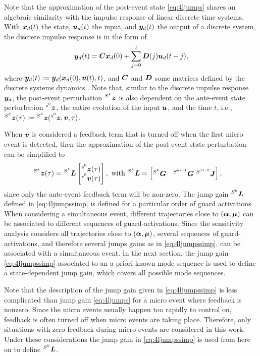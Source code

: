 \documentclass[../DC2019003Bouma.tex]{subfiles}
\begin{document}
Note that the approximation of the post-event state \eqref{eq:4ljumps} shares an algebraic similarity with the impulse response of linear discrete time systems. With ${\boldsymbol{x}}_d(t)$ the state, ${\boldsymbol{u}}_d(t)$ the input, and ${\boldsymbol{y}}_d(t)$ the output of a discrete system, the discrete impulse response is in the form of
\begin{align}
{\boldsymbol{y}}_d(t) = {\boldsymbol{C}}{\boldsymbol{x}}_d(0) + \sum_{j=0}^t{\boldsymbol{D}}(j){\boldsymbol{u}}_d(t-j),
\end{align}
where ${\boldsymbol{y}}_d(t) :=  {\boldsymbol{y}}_d({\boldsymbol{x}}_d(0),{\boldsymbol{u}}(t),t)$, and ${\boldsymbol{C}}$ and ${\boldsymbol{D}}$ some matrices defined by the discrete systems dynamics \cite{Hespanha2009}. Note that, similar to the discrete impulse response ${\boldsymbol{y}}_d$, the post-event perturbation $\hspace{0cm}^{S^k}{\boldsymbol{z}}$ is also dependent on the ante-event state perturbation $\hspace{0cm}^{s^0}{\boldsymbol{z}}$, the entire evolution of the input ${\boldsymbol{u}}$, and the time $t$, i.e., $\hspace{0cm}^{S^k}{\boldsymbol{z}}(\tau) := \hspace{0cm}^{S^k}{\boldsymbol{z}}(\hspace{0cm}^{s^0}{\boldsymbol{z}},{\boldsymbol{v}},\tau)$.

When ${\boldsymbol{v}}$ is considered a feedback term that is turned off when the first micro event is detected, then the approximation of the post-event state perturbation can be simplified to
\begin{align}
\hspace{0cm}^{S^k}{\boldsymbol{z}}(\tau) &= \hspace{0cm}^{S^k}{\boldsymbol{L}} \begin{bmatrix}
\hspace{0cm}^{s^0}{\boldsymbol{z}}(\tau) \\ \hspace{0cm}^{s^0}{\boldsymbol{v}}(\tau)
\end{bmatrix}, \text{ with }\hspace{0cm}^{S^k}{\boldsymbol{L}} = \begin{bmatrix}
\hspace{0cm}^{S^k}{\boldsymbol{G}} & \hspace{0cm}^{S^{k\leftarrow 1}}{\boldsymbol{G}}\ \hspace{0cm}^{S^{1\leftarrow 0}}{\boldsymbol{J}}
\end{bmatrix},\label{eq:4ljumpssimp}
\end{align}
since only the ante-event feedback term will be non-zero. The jump gain $\hspace{0cm}^{S^k}{\boldsymbol{L}}$ defined in \eqref{eq:4ljumpssimp} is defined for a particular order of guard activations. When considering a simultaneous event, different trajectories close to $(\boldsymbol{\alpha},\boldsymbol{\mu})$ can be associated to different sequences of guard-activations. Since the sensitivity analysis considers all trajectories close to $(\boldsymbol{\alpha},\boldsymbol{\mu})$, several sequences of guard-activations, and therefore several jumps gains as in \eqref{eq:4ljumpssimp}, can be associated with a simultaneous event. In the next section, the jump gain \eqref{eq:4ljumpssimp} associated to an a priori known mode sequence is used to define a state-dependent jump gain, which covers all possible mode sequences. 

Note that the description of the jump gain given in \eqref{eq:4ljumpssimp} is less complicated than jump gain \eqref{eq:4ljumps} for a micro event where feedback is nonzero. Since the micro events usually happen too rapidly to control on, feedback is often turned off when micro events are taking place. Therefore, only situations with zero feedback during micro events are considered in this work. Under these considerations the jump gain in \eqref{eq:4ljumpssimp} is used from here on to define $\hspace{0cm}^{S^k}{\boldsymbol{L}}$.
\end{document}
